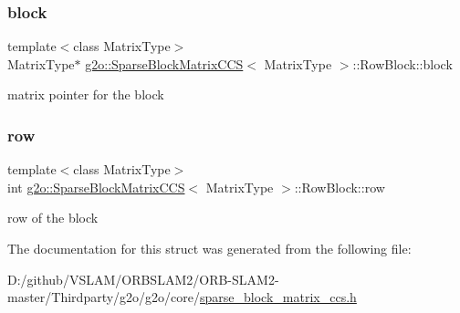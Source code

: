 \subsubsection{\texorpdfstring{block}{block}}
{\footnotesize\ttfamily template$<$class Matrix\+Type$>$ \\
Matrix\+Type$\ast$ \mbox{\hyperlink{classg2o_1_1_sparse_block_matrix_c_c_s}{g2o\+::\+Sparse\+Block\+Matrix\+C\+CS}}$<$ Matrix\+Type $>$\+::Row\+Block\+::block}



matrix pointer for the block 

\mbox{\label{structg2o_1_1_sparse_block_matrix_c_c_s_1_1_row_block_af414f235d5aa28ca1508cfa0860c4949}} 
\subsubsection{\texorpdfstring{row}{row}}
{\footnotesize\ttfamily template$<$class Matrix\+Type$>$ \\
int \mbox{\hyperlink{classg2o_1_1_sparse_block_matrix_c_c_s}{g2o\+::\+Sparse\+Block\+Matrix\+C\+CS}}$<$ Matrix\+Type $>$\+::Row\+Block\+::row}



row of the block 



The documentation for this struct was generated from the following file\+:\begin{DoxyCompactItemize}
\item 
D\+:/github/\+V\+S\+L\+A\+M/\+O\+R\+B\+S\+L\+A\+M2/\+O\+R\+B-\/\+S\+L\+A\+M2-\/master/\+Thirdparty/g2o/g2o/core/\mbox{\hyperlink{sparse__block__matrix__ccs_8h}{sparse\+\_\+block\+\_\+matrix\+\_\+ccs.\+h}}\end{DoxyCompactItemize}
